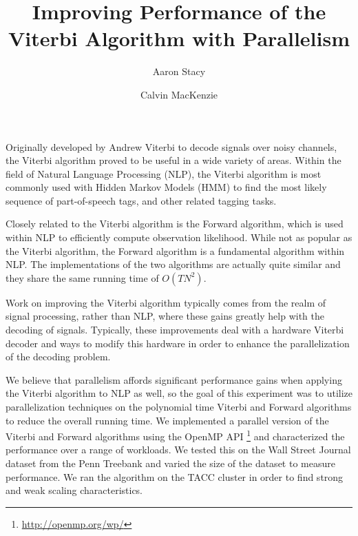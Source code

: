 \documentclass[11pt,onecolumn]{article}
\begin{document}
\title{Improving Performance of the Viterbi Algorithm with Parallelism}

\author{
 Aaron Stacy \\ \and
 Calvin MacKenzie \\
}


\maketitle


Originally developed by Andrew Viterbi to decode signals over noisy channels, the Viterbi algorithm proved to be useful in a wide variety of areas. Within the field of Natural Language Processing (NLP), the Viterbi algorithm is most commonly used with Hidden Markov Models (HMM) to find the most likely sequence of part-of-speech tags, and other related tagging tasks.

Closely related to the Viterbi algorithm is the Forward algorithm, which is used within NLP to efficiently compute observation likelihood. While not as popular as the Viterbi algorithm, the Forward algorithm is a fundamental algorithm within NLP. The implementations of the two algorithms are actually quite similar and they share the same running time of $O(T N^2)$.

Work on improving the Viterbi algorithm typically comes from the realm of signal processing, rather than NLP, where these gains greatly help with the decoding of signals. Typically, these improvements deal with a hardware Viterbi decoder and ways to modify this hardware in order to enhance the parallelization of the decoding problem.

We believe that parallelism affords significant performance gains when applying the Viterbi algorithm to NLP as well, so the goal of this experiment was to utilize parallelization techniques on the polynomial time Viterbi and Forward algorithms to reduce the overall running time. We implemented a parallel version of the Viterbi and Forward algorithms using the OpenMP API \footnote{\url{http://openmp.org/wp/}} and characterized the performance over a range of workloads. We tested this on the Wall Street Journal dataset from the Penn Treebank and varied the size of the dataset to measure performance. We ran the algorithm on the TACC cluster in order to find strong and weak scaling characteristics.
\end{document}
